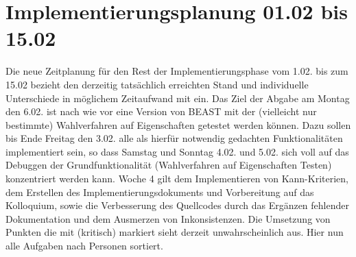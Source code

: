 \documentclass[a4paper]{scrreprt}
\begin{document}
\chapter{Implementierungsplanung 01.02 bis 15.02}

Die neue Zeitplanung für den Rest der Implementierungsphase vom 1.02. bis zum 15.02 bezieht den derzeitig tatsächlich erreichten Stand und individuelle Unterschiede in möglichem Zeitaufwand mit ein. Das Ziel der Abgabe am Montag den 6.02. ist nach wie vor eine Version von BEAST mit der (vielleicht nur bestimmte) Wahlverfahren auf Eigenschaften getestet werden können. Dazu sollen bis Ende Freitag den 3.02. alle als hierfür notwendig gedachten Funktionalitäten implementiert sein, so dass Samstag und Sonntag 4.02. und 5.02. sich voll auf das Debuggen der Grundfunktionalität (Wahlverfahren auf Eigenschaften Testen) konzentriert werden kann.
Woche 4 gilt dem Implementieren von Kann-Kriterien, dem Erstellen des Implementierungsdokuments und Vorbereitung auf das Kolloquium, sowie die Verbesserung des Quellcodes durch das Ergänzen fehlender Dokumentation und dem Ausmerzen von Inkonsistenzen.
Die Umsetzung von Punkten die mit (kritisch) markiert sieht derzeit unwahrscheinlich aus.
Hier nun alle Aufgaben nach Personen sortiert. \\
\end{document}
